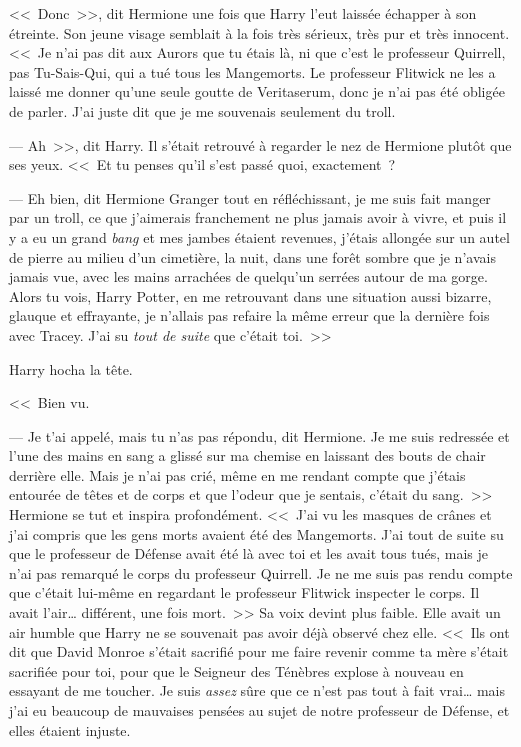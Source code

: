<<~Donc~>>, dit Hermione une fois que Harry l'eut laissée échapper à son étreinte. Son jeune visage semblait à la fois très sérieux, très pur et très innocent. <<~Je n'ai pas dit aux Aurors que tu étais là, ni que c'est le professeur Quirrell, pas Tu-Sais-Qui, qui a tué tous les Mangemorts. Le professeur Flitwick ne les a laissé me donner qu'une seule goutte de Veritaserum, donc je n'ai pas été obligée de parler. J'ai juste dit que je me souvenais seulement du troll.

--- Ah~>>, dit Harry. Il s'était retrouvé à regarder le nez de Hermione plutôt que ses yeux. <<~Et tu penses qu'il s'est passé quoi, exactement~?

--- Eh bien, dit Hermione Granger tout en réfléchissant, je me suis fait manger par un troll, ce que j'aimerais franchement ne plus jamais avoir à vivre, et puis il y a eu un grand \emph{bang} et mes jambes étaient revenues, j'étais allongée sur un autel de pierre au milieu d'un cimetière, la nuit, dans une forêt sombre que je n'avais jamais vue, avec les mains arrachées de quelqu'un serrées autour de ma gorge. Alors tu vois, Harry Potter, en me retrouvant dans une situation aussi bizarre, glauque et effrayante, je n'allais pas refaire la même erreur que la dernière fois avec Tracey. J'ai su \emph{tout de suite} que c'était toi.~>>

Harry hocha la tête.

<<~Bien vu.

--- Je t'ai appelé, mais tu n'as pas répondu, dit Hermione. Je me suis redressée et l'une des mains en sang a glissé sur ma chemise en laissant des bouts de chair derrière elle. Mais je n'ai pas crié, même en me rendant compte que j'étais entourée de têtes et de corps et que l'odeur que je sentais, c'était du sang.~>> Hermione se tut et inspira profondément. <<~J'ai vu les masques de crânes et j'ai compris que les gens morts avaient été des Mangemorts. J'ai tout de suite su que le professeur de Défense avait été là avec toi et les avait tous tués, mais je n'ai pas remarqué le corps du professeur Quirrell. Je ne me suis pas rendu compte que c'était lui-même en regardant le professeur Flitwick inspecter le corps. Il avait l'air… différent, une fois mort.~>> Sa voix devint plus faible. Elle avait un air humble que Harry ne se souvenait pas avoir déjà observé chez elle. <<~Ils ont dit que David Monroe s'était sacrifié pour me faire revenir comme ta mère s'était sacrifiée pour toi, pour que le Seigneur des Ténèbres explose à nouveau en essayant de me toucher. Je suis \emph{assez} sûre que ce n'est pas tout à fait vrai… mais j'ai eu beaucoup de mauvaises pensées au sujet de notre professeur de Défense, et elles étaient injuste.


